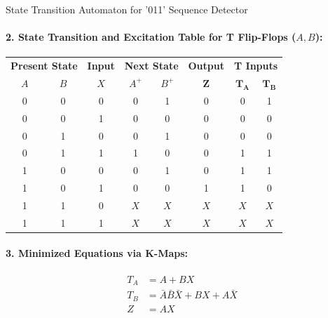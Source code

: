 \documentclass[11pt,a4paper,oneside]{book}
\begin{document}
\begin{schematicbox}{State Transition Automaton for '011' Sequence Detector}
\centering
{}
\end{schematicbox}

\paragraph{2. State Transition and Excitation Table for T Flip-Flops ($A, B$):}
\begin{center}
\begin{tabular}{|cc|c|cc|c|cc|}
\hline
\multicolumn{2}{|c|}{\textbf{Present State}} & \textbf{Input} & \multicolumn{2}{c|}{\textbf{Next State}} & \textbf{Output} & \multicolumn{2}{c|}{\textbf{T Inputs}} \\
$A$ & $B$ & $X$ & $A^+$ & $B^+$ & $\mathbf{Z}$ & $\mathbf{T_A}$ & $\mathbf{T_B}$ \\ \hline
0 & 0 & 0 & 0 & 1 & 0 & 0 & 1 \\ \hline
0 & 0 & 1 & 0 & 0 & 0 & 0 & 0 \\ \hline
0 & 1 & 0 & 0 & 1 & 0 & 0 & 0 \\ \hline
0 & 1 & 1 & 1 & 0 & 0 & 1 & 1 \\ \hline
1 & 0 & 0 & 0 & 1 & 0 & 1 & 1 \\ \hline
1 & 0 & 1 & 0 & 0 & 1 & 1 & 0 \\ \hline
1 & 1 & 0 & $X$ & $X$ & $X$ & $X$ & $X$ \\ \hline
1 & 1 & 1 & $X$ & $X$ & $X$ & $X$ & $X$ \\ \hline
\end{tabular}
\end{center}

\paragraph{3. Minimized Equations via K-Maps:}
\begin{align*}
T_A &= A + BX \\
T_B &= \bar{A}\bar{B}\bar{X} + BX + A\bar{X} \\
Z &= AX
\end{align*}
\end{document}
